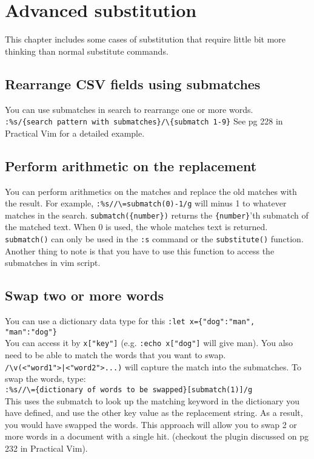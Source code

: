 \chapter{Advanced substitution}

This chapter includes some cases of substitution that require little bit more thinking than normal substitute commands.

\section{Rearrange CSV fields using submatches}

You can use submatches in search to rearrange one or more words.\\
\verb|:%s/{search pattern with submatches}/\{submatch 1-9}|
See pg 228 in Practical Vim for a detailed example.

\section{Perform arithmetic on the replacement}

You can perform arithmetics on the matches and replace the old matches with the result.
For example, \verb|:%s//\=submatch(0)-1/g| will minus 1 to whatever matches in the search.
\verb|submatch({number})| returns the \verb|{number}|'th submatch of the matched text.
When 0 is used, the whole matches text is returned.
\verb|submatch()| can only be used in the \verb|:s| command or the \verb|substitute()| function.
Another thing to note is that you have to use this function to access the submatches in vim script.

\section{Swap two or more words}

You can use a dictionary data type for this \verb|:let x={"dog":"man", "man":"dog"}|\\
You can access it by \verb|x["key"]| (e.g. \verb|:echo x["dog"]| will give man).
You also need to be able to match the words that you want to swap.\\
\verb-/\v(<"word1">|<"word2">...)- will capture the match into the submatches.
To swap  the words, type:\\
\verb|:%s//\={dictionary of words to be swapped}[submatch(1)]/g|\\
This uses the submatch to look up the matching keyword in the dictionary you have defined, and use the other key value as the replacement string.
As a result, you would have swapped the words.
This approach will allow you to swap 2 or more words in a document with a single hit.
(checkout the plugin discussed on pg 232 in Practical Vim).

